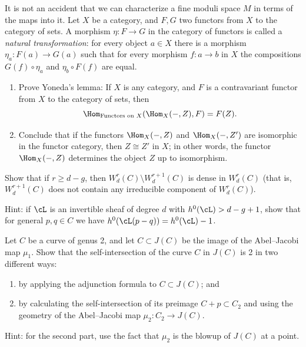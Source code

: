 \begin{exercise}\label{Yoneda}
It is not an accident that we can characterize a 
fine moduli space
%
$M$ in terms of the maps into it. 
 Let $X$ be a category, and $F,G$ two functors from $X$ to the category of sets.
 A morphism $\eta: F\to G$ in the category of functors is called a 
\emph{natural transformation}:
%
 for every object $a\in X$ there is a morphism $\eta_a:F(a) \to G(a)$ such that for every
 morphism $f: a\to b$ in $X$ the compositions $G(f)\circ \eta_a$ and $\eta_b\circ F(f)$
 are equal. 
\begin{enumerate}
 \item Prove Yoneda's lemma: 
%
If $X$ is any category, and $F$ is a contravariant functor from $X$ to the category of sets, then 
 $$
 \Hom_{\hbox{\scriptsize Functors on $X$}}(\Hom_X( -, Z), F) = F(Z)
.
 $$
 \item Conclude that if the functors $\Hom_X( -, Z)$ and $\Hom_X( -, Z')$ are isomorphic in the functor category, 
 then $Z \cong Z'$ in $X$; 
in other words,
the functor $\Hom_X( -, Z)$ determines the object $Z$ up to isomorphism.
 \end{enumerate}
\end{exercise}

\begin{exercise}
Show that if $r \geq d-g$, then $W^r_d(C) \setminus W^{r+1}_d(C)$ is
dense in $W^r_d(C)$ (that is, $W^{r+1}_d(C)$ does not contain any
irreducible component of $W^r_d(C)$).

Hint: if $\cL$ is an invertible sheaf of degree $d$ with $h^0(\cL) > d-g+1$, show that for general $p, q \in C$ we have $h^0(\cL(p-q))  = h^0(\cL) - 1$.
\end{exercise}

\begin{exercise}
Let $C$ be a curve of genus 2, and let $C \subset J(C)$ be the image
of the 
Abel--Jacobi map
%
$\mu_1$. Show that the 
self-intersection 
%
of the curve $C$ in $J(C)$ is 2 in two different ways:
\begin{enumerate}
\item by applying the 
adjunction formula
%
 to $C \subset J(C)$; and
\item by calculating the self-intersection of its preimage 
$C + p \subset C_2$ and using the geometry of the 
Abel--Jacobi map $\mu_2 : C_2 \to J(C)$.
\end{enumerate}

Hint: for the second part, use the fact that 
$\mu_2$
is the 
blowup
%
of $J(C)$ at a point.
\end{exercise}

